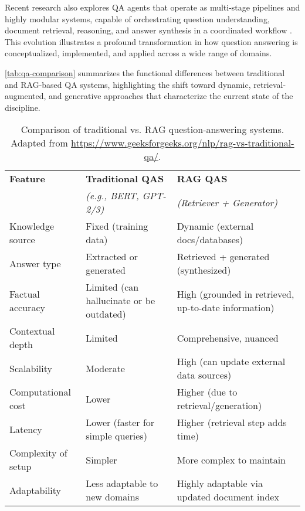 \begin{spacing}{1.5}
Recent research also explores QA agents that operate as multi-stage pipelines and highly modular systems, capable of orchestrating question understanding, document retrieval, reasoning, and answer synthesis in a coordinated workflow \citep{skarlinski_language_2024}. This evolution illustrates a profound transformation in how question answering is conceptualized, implemented, and applied across a wide range of domains.


\autoref{tab:qa-comparison} summarizes the functional differences between traditional and RAG-based QA systems, highlighting the shift toward dynamic, retrieval-augmented, and generative approaches that characterize the current state of the discipline. 

\addtocounter{table}{-1}
\begin{table}[H]
\centering
\begin{tabularx}{\textwidth}{l>{\raggedright\arraybackslash}X>{\raggedright\arraybackslash}X}
\toprule
\textbf{Feature} & \textbf{Traditional QAS} & \textbf{RAG QAS} \\
& \textit{(e.g., BERT, GPT-2/3)} & \textit{(Retriever + Generator)} \\
\midrule
Knowledge source & Fixed (training data) & Dynamic (external docs/databases) \\
Answer type & Extracted or generated & Retrieved + generated (synthesized) \\
Factual accuracy & Limited (can hallucinate or be outdated) & High (grounded in retrieved, up-to-date information) \\
Contextual depth & Limited & Comprehensive, nuanced \\
Scalability & Moderate & High (can update external data sources) \\
Computational cost & Lower & Higher (due to retrieval/generation) \\
Latency & Lower (faster for simple queries) & Higher (retrieval step adds time) \\
Complexity of setup & Simpler & More complex to maintain \\
Adaptability & Less adaptable to new domains & Highly adaptable via updated document index \\
\bottomrule
\end{tabularx}
\vspace{0.5em}
\caption{Comparison of traditional vs. RAG question-answering systems.\\ \footnotesize{Adapted from \url{https://www.geeksforgeeks.org/nlp/rag-vs-traditional-qa/}.\nocite{noauthor_rag_2025}}}
\label{tab:qa-comparison}
\end{table}

\end{spacing}
